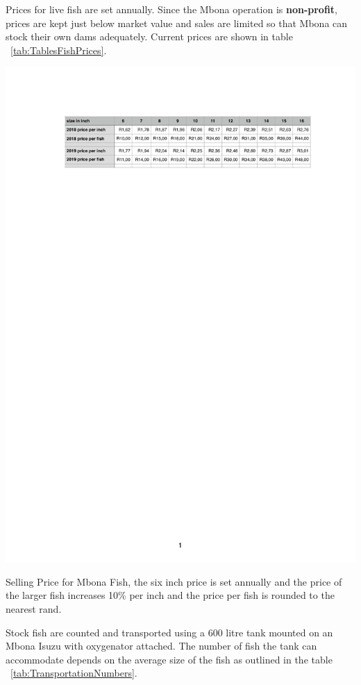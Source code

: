     Prices for live fish are set annually. Since the Mbona operation is {\bf non-profit}, prices
    are kept just below market value and sales are limited so that Mbona can stock their
    own dams adequately. Current prices are shown in table ~\ref{tab:TablesFishPrices}.
    
    \begin{table}[H]
  \centering
   \includegraphics[scale = 0.8]{tables/TablesFishPrices.pdf}
   \caption{Selling Price for Mbona Fish, the six inch price is set annually and
   the price of the larger fish increases 10\% per inch and the price per fish is
   rounded to the nearest rand.}
   \label{tab:TablesFishPrices}
\end{table}
    
    Stock fish are counted and transported using a 600 litre tank mounted on 
    an Mbona Isuzu with oxygenator attached.  The number of fish the tank can  
    accommodate depends on the average size of the fish as outlined in the table ~\ref{tab:TransportationNumbers}.
    
